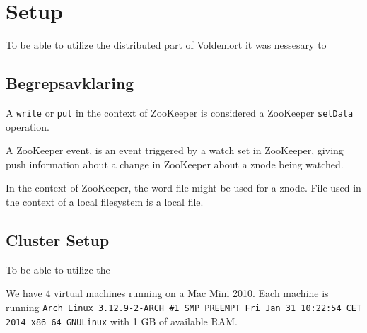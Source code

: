 \section{Setup}
\label{sec:setup}

To be able to utilize the distributed part of Voldemort it was nessesary to 

\subsection{Begrepsavklaring}
A \texttt{write} or \texttt{put} in the context of ZooKeeper is considered a ZooKeeper \texttt{setData} operation.

A ZooKeeper event, is an event triggered by a watch set in ZooKeeper, giving push information about a change in ZooKeeper about a znode being watched.

In the context of ZooKeeper, the word file might be used for a znode. File used in the context of a local filesystem is a local file.

\subsection{Cluster Setup}
To be able to utilize the 


We have 4 virtual machines running on a Mac Mini 2010. Each machine is running \texttt{Arch Linux 3.12.9-2-ARCH \#1 SMP PREEMPT Fri Jan 31 10:22:54 CET 2014 x86\_64 GNU\/Linux} with 1 GB of available RAM. 
